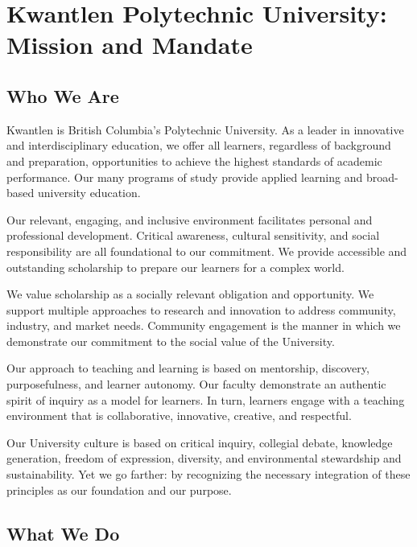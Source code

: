 \documentclass[10pt,DIVcalc,oneside,letterpaper,headexclude]{scrreprt}
\begin{document}
\setlength{\columnseprule}{1pt}
\setlength{\columnsep}{3em}
\section{Kwantlen Polytechnic University: Mission and Mandate}
\raggedcolumns
\begin{multicols}{2}


\subsection{Who We Are}
Kwantlen is British Columbia's Polytechnic University. As a leader in innovative and interdisciplinary education, we offer all learners, regardless of background and preparation, opportunities to achieve the highest standards of academic performance. Our many programs of study provide applied learning and broad-based university education.

Our relevant, engaging, and inclusive environment facilitates personal and professional development. Critical awareness, cultural sensitivity, and social responsibility are all foundational to our commitment. We provide accessible and outstanding scholarship to prepare our learners for a complex world.

We value scholarship as a socially relevant obligation and opportunity. We support multiple approaches to research and innovation to address community, industry, and market needs. Community engagement is the manner in which we demonstrate our commitment to the social value of the University.

Our approach to teaching and learning is based on mentorship, discovery, purposefulness, and learner autonomy. Our faculty demonstrate an authentic spirit of inquiry as a model for learners. In turn, learners engage with a teaching environment that is collaborative, innovative, creative, and respectful.

Our University culture is based on critical inquiry, collegial debate, knowledge generation, freedom of expression, diversity, and environmental stewardship and sustainability. Yet we go farther: by recognizing the necessary integration of these principles as our foundation and our purpose.

\columnbreak

\subsection{What We Do}


\end{multicols}
\end{document}
